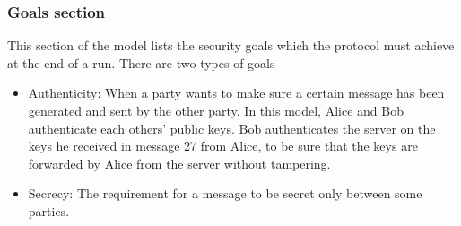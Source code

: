 \subsubsection{Goals section}
This section of the model lists the security goals which the protocol must achieve at the end of a run. There are two types of goals
\begin{itemize}
	\item Authenticity: When a party wants to make sure a certain message has been generated and sent by the other party. In this model, Alice and Bob authenticate each others' public keys. Bob authenticates the server on the keys he received in message 27 from Alice, to be sure that the keys are forwarded by Alice from the server without tampering.
	\item Secrecy: The requirement for a message to be secret only between some parties.
\end{itemize}





